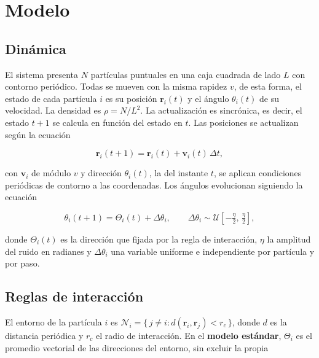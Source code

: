 \documentclass[10pt,a4paper]{article}
\begin{document}
\section{Modelo}

\subsection{Dinámica}

El sistema presenta $N$ partículas puntuales en una caja cuadrada de lado $L$ con contorno periódico. Todas se mueven con la misma rapidez $v$, de esta forma, el estado de cada partícula $i$ es su posición $\mathbf{r}_i(t)$ y el ángulo $\theta_i(t)$ de su velocidad. La densidad es $\rho = N/L^2$. La actualización es sincrónica, es decir, el estado $t+1$ se calcula en función del estado en $t$. Las posiciones se actualizan según la ecuación

\begin{equation}
    \mathbf{r}_i(t+1) = \mathbf{r}_i(t) + \mathbf{v}_i(t)\,\Delta t,
    \label{eq:posicion}
\end{equation}

con $\mathbf{v}_i$ de módulo $v$ y dirección $\theta_i(t)$, la del instante $t$, se aplican condiciones periódicas de contorno a las coordenadas. Los ángulos evolucionan siguiendo la ecuación

\begin{equation}
    \theta_i(t+1) = \Theta_i(t) + \Delta\theta_i,
    \qquad
    \Delta\theta_i \sim \mathcal{U}\!\left[-\tfrac{\eta}{2},\, \tfrac{\eta}{2}\right],
    \label{eq:angulo}
\end{equation}

donde $\Theta_i(t)$ es la dirección que fijada por la regla de interacción, $\eta$ la amplitud del ruido en radianes y $\Delta\theta_i$ una variable uniforme e independiente por partícula y por paso.

\subsection{Reglas de interacción}

El entorno de la partícula $i$ es $\mathcal{N}_i = \{\, j \neq i : d(\mathbf{r}_i, \mathbf{r}_j) < r_c \,\}$, donde $d$ es la distancia periódica y $r_c$ el radio de interacción.
En el \textbf{modelo estándar}, $\Theta_i$ es el promedio vectorial de las direcciones del entorno, sin excluir la propia
\end{document}
